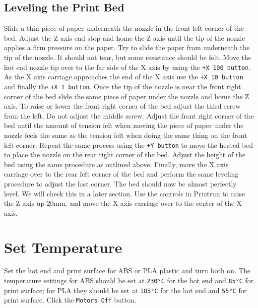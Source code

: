 \subsection{Leveling the Print Bed}
Slide a thin piece of paper underneath the nozzle in the front left corner of the bed. Adjust the Z axis end stop and home the Z axis until the tip of the nozzle applies a firm pressure on the paper. Try to slide the paper from underneath the tip of the nozzle. It should not tear, but some resistance should be felt. Move the hot end nozzle tip over to the far side of the X axis by using the \texttt{+X 100 button}. As the X axis carriage approaches the end of the X axis use the \texttt{+X 10 button} and finally the \texttt{+X 1 button}. Once the tip of the nozzle is near the front right corner of the bed slide the same piece of paper under the nozzle and home the Z axis. To raise or lower the front right corner of the bed adjust the third screw from the left. Do not adjust the middle screw. Adjust the front right corner of the bed until the amount of tension felt when moving the piece of paper under the nozzle feels the same as the tension felt when doing the same thing on the front left corner. Repeat the same process using the \texttt{+Y button} to move the heated bed to place the nozzle on the rear right corner of the bed. Adjust the height of the bed using the same procedure as outlined above. Finally, move the X axis carriage over to the rear left corner of the bed and perform the same leveling procedure to adjust the last corner. The bed should now be almost perfectly level. We will check this in a later section. Use the controls in Printrun to raise the Z axis up 20mm, and move the X axis carriage over to the center of the X axis.

\section{Set Temperature}
Set the hot end and print surface for ABS or PLA plastic and turn both on. The temperature settings for ABS should be set at \texttt{230°C} for the hot end and \texttt{85°C} for print surface; for PLA they should be set at \texttt{185°C} for the hot end and \texttt{55°C} for print surface. Click the \texttt{Motors Off} button.
